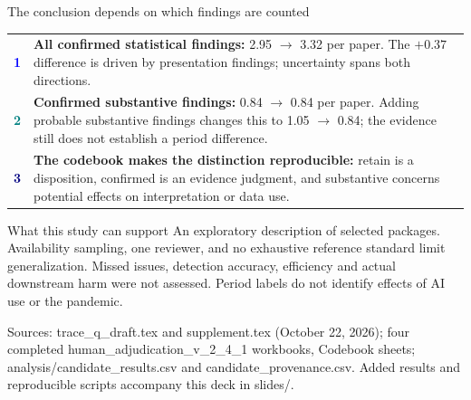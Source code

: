 \documentclass[10pt,aspectratio=169]{beamer}
\newcommand{\src}[1]{\par\vfill{\color{Slate}\fontsize{6.5}{8}\selectfont #1\par}}
\newcommand{\smalltext}{\fontsize{8.5}{10.4}\selectfont}
\begin{document}
\begin{frame}[t]{The conclusion depends on which findings are counted}
\begin{tabularx}{\linewidth}{@{}p{.55cm}Y@{}}
\textcolor{Blue}{\Large\textbf{1}} & \textbf{All confirmed statistical findings:} 2.95 $\rightarrow$ 3.32 per paper. The $+0.37$ difference is driven by presentation findings; uncertainty spans both directions.\\[2mm]
\textcolor{Teal}{\Large\textbf{2}} & \textbf{Confirmed substantive findings:} 0.84 $\rightarrow$ 0.84 per paper. Adding probable substantive findings changes this to 1.05 $\rightarrow$ 0.84; the evidence still does not establish a period difference.\\[2mm]
\textcolor{Navy}{\Large\textbf{3}} & \textbf{The codebook makes the distinction reproducible:} retain is a disposition, confirmed is an evidence judgment, and substantive concerns potential effects on interpretation or data use.
\end{tabularx}
\medskip
\begin{block}{What this study can support}
\smalltext
An exploratory description of selected packages. Availability sampling, one reviewer, and no exhaustive reference standard limit generalization. Missed issues, detection accuracy, efficiency and actual downstream harm were not assessed. Period labels do not identify effects of AI use or the pandemic.
\end{block}
\src{Sources: trace\_q\_draft.tex and supplement.tex (October 22, 2026); four completed human\_adjudication\_v\_2\_4\_1 workbooks, Codebook sheets; analysis/candidate\_results.csv and candidate\_provenance.csv. Added results and reproducible scripts accompany this deck in slides/.}
\end{frame}
\end{document}
